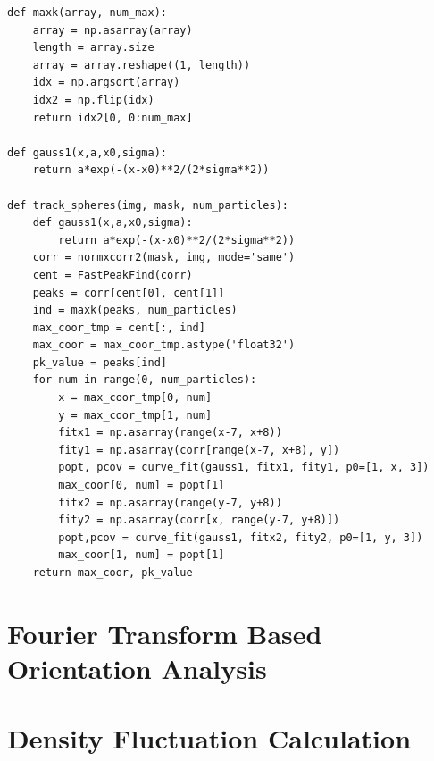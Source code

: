 \begin{verbatim}
def maxk(array, num_max):
    array = np.asarray(array)
    length = array.size
    array = array.reshape((1, length))
    idx = np.argsort(array)
    idx2 = np.flip(idx)
    return idx2[0, 0:num_max]

def gauss1(x,a,x0,sigma):
    return a*exp(-(x-x0)**2/(2*sigma**2))

def track_spheres(img, mask, num_particles):
    def gauss1(x,a,x0,sigma):
        return a*exp(-(x-x0)**2/(2*sigma**2))
    corr = normxcorr2(mask, img, mode='same')
    cent = FastPeakFind(corr)
    peaks = corr[cent[0], cent[1]]
    ind = maxk(peaks, num_particles)
    max_coor_tmp = cent[:, ind]
    max_coor = max_coor_tmp.astype('float32')
    pk_value = peaks[ind]
    for num in range(0, num_particles):
        x = max_coor_tmp[0, num]
        y = max_coor_tmp[1, num]
        fitx1 = np.asarray(range(x-7, x+8))
        fity1 = np.asarray(corr[range(x-7, x+8), y])
        popt, pcov = curve_fit(gauss1, fitx1, fity1, p0=[1, x, 3])
        max_coor[0, num] = popt[1]
        fitx2 = np.asarray(range(y-7, y+8))
        fity2 = np.asarray(corr[x, range(y-7, y+8)])
        popt,pcov = curve_fit(gauss1, fitx2, fity2, p0=[1, y, 3])
        max_coor[1, num] = popt[1]
    return max_coor, pk_value
\end{verbatim}


\section{Fourier Transform Based Orientation Analysis}
\label{fourier-transform-based-orientation-analysis}

\section{Density Fluctuation Calculation}
